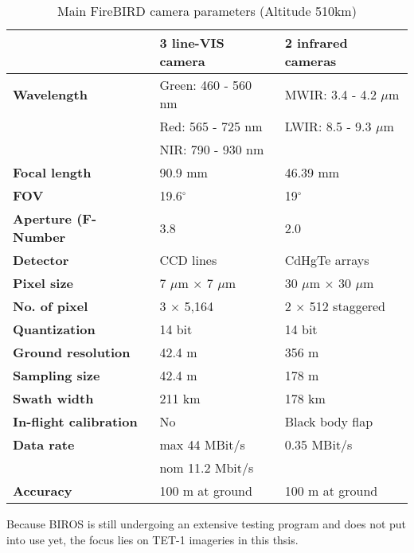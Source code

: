 \begin{table}[!ht]
\caption{Main FireBIRD camera parameters (Altitude 510km) \parencite{Reference11}}
\centering
\begin{tabular} {l|l|l}
 \hline\hline
   & \textbf{3 line-VIS camera} & \textbf{2 infrared cameras} \\
 \hline
 \textbf{Wavelength} & Green: 460 - 560 nm  & MWIR: 3.4 - 4.2 $\mu$m \\
  & Red: 565 - 725 nm & LWIR: 8.5 - 9.3 $\mu$m \\
  & NIR: 790 - 930 nm & \\ 
 \hline
 \textbf{Focal length} & 90.9 mm & 46.39 mm \\
 \hline
 \textbf{FOV} & 19.6$^\circ$ & 19$^\circ$ \\
 \hline
 \textbf{Aperture (F-Number} & 3.8 & 2.0 \\
 \hline
 \textbf{Detector} & CCD lines & CdHgTe arrays \\
 \hline
 \textbf{Pixel size} & 7 $\mu$m $\times$ 7 $\mu$m & 30 $\mu$m $\times$ 30 $\mu$m \\
 \hline
 \textbf{No. of pixel} & 3 $\times$ 5,164 & 2 $\times$ 512 staggered \\
 \hline
 \textbf{Quantization} & 14 bit & 14 bit \\
 \hline
 \textbf{Ground resolution} & 42.4 m & 356 m \\
 \hline
 \textbf{Sampling size} & 42.4 m & 178 m \\
 \hline
 \textbf{Swath width} & 211 km & 178 km \\
 \hline
 \textbf{In-flight calibration} & No & Black body flap \\
 \hline
 \textbf{Data rate} & max 44 MBit/s & 0.35 MBit/s \\
  & nom 11.2 Mbit/s & \\
 \hline
 \textbf{Accuracy} & 100 m at ground & 100 m at ground \\
 \hline\hline
\end{tabular}
\label{ParaFireBIRD}
\end{table}
   

\noindent Because BIROS is still undergoing an extensive testing program and does not put into use yet, the focus lies on TET-1 imageries in this thsis.\\ 


